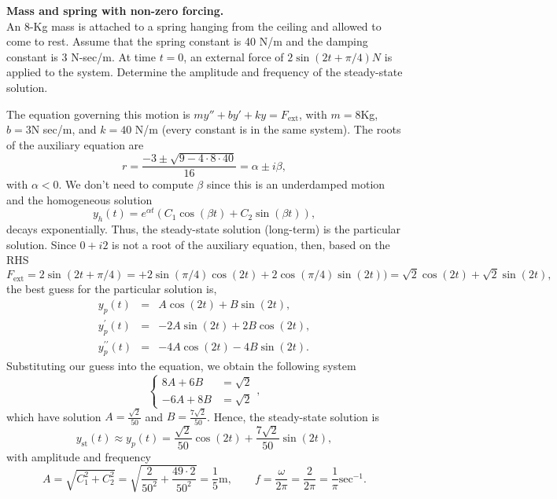 \documentclass[11pt]{article}
\begin{document}
\begin{problem}
\textbf{Mass and spring with non-zero forcing.} \\
An 8-Kg mass is attached to a spring hanging from the ceiling and allowed to come to rest. Assume that the spring constant is 40 N/m and the damping constant is 3 N-sec/m. At time $t=0$, an external force of $2\sin(2t +\pi/4)N$ is applied to the system. Determine the amplitude and frequency of the steady-state solution.
\end{problem}
\begin{solution}
The equation governing this motion is $my''+by'+ky=F_{\text{ext}}$, with $m=8$Kg, $b=3$N sec/m, and $k=40$ N/m (every constant is in the same system). The roots of the auxiliary equation are
\[r=\frac{-3\pm \sqrt{9-4\cdot8\cdot 40}}{16}=\alpha \pm i \beta,\]
with $\alpha < 0$. We don't need to compute $\beta$ since this is an underdamped motion and the homogeneous solution
\[y_{h}(t)=e^{\alpha t}(C_{1}\cos(\beta t) +C_{2}\sin(\beta t)),\]
decays exponentially. Thus, the steady-state solution (long-term) is the particular solution. Since $0+i2$ is not a root of the auxiliary equation, then, based on the RHS
\[F_{\text{ext}}=2\sin(2t +\pi/4)=+2\sin(\pi/4)\cos(2t)+2\cos(\pi/4)\sin(2t))=\sqrt{2}\cos(2t)+\sqrt{2}\sin(2t),\]
the best guess for the particular solution is,
\begin{eqnarray*}
y_{p}(t) & = & A \cos(2t) + B \sin(2t) ,\\
y_{p}^{\prime}(t) &= &-2A \sin(2t) + 2B \cos(2t) ,\\
y_{p}^{\prime \prime}(t) &= & -4A \cos(2t) - 4B \sin(2t).
\end{eqnarray*}
Substituting our guess into the equation, we obtain the following system
\begin{equation*}\left\{
\begin{array}{cc}
8A + 6B &=\sqrt{2}\\
-6A + 8B &=\sqrt{2}
\end{array}\right. ,
\end{equation*}
which have solution $A=\frac{\sqrt{2}}{50}$ and $B=\frac{7\sqrt{2}}{50}$.
Hence, the steady-state solution is $$y_{\text{st}}(t)\approx y_{p}(t) = \frac{\sqrt{2}}{50}\cos(2t)+ \frac{7\sqrt{2}}{50}\sin(2t),$$
with amplitude and frequency 
\[\boxed{A=\sqrt{C_{1}^{2}+C_{2}^{2}}=\sqrt{\frac{2}{50^{2}}+\frac{49\cdot 2}{50^{2}}}=\frac{1}{5}\text{m}}, \qquad \boxed{f=\frac{\omega}{2\pi}=\frac{2}{2\pi}=\frac{1}{\pi}\text{sec}^{-1}}.\]
\end{solution}
\end{document}
